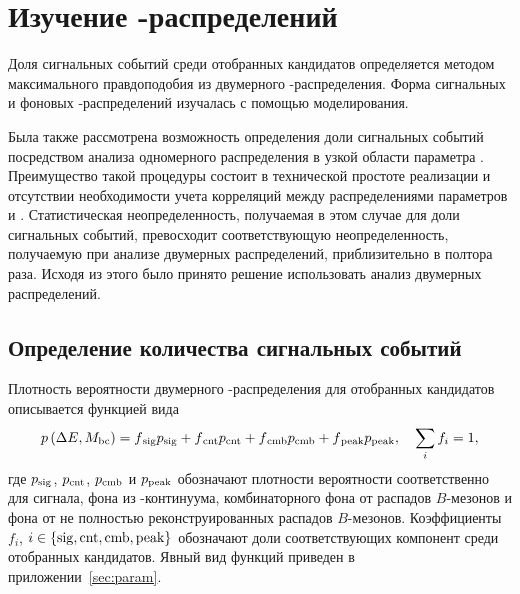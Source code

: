 \section{Изучение \de-\mbc распределений}\label{sec:dembc}
Доля сигнальных событий среди отобранных кандидатов определяется методом максимального правдоподобия из двумерного \de-\mbc распределения.  Форма сигнальных и фоновых \de-\mbc распределений изучалась с помощью моделирования.  

Была также рассмотрена возможность определения доли сигнальных событий посредством анализа одномерного \de распределения в узкой области параметра \mbc.  Преимущество такой процедуры состоит в технической простоте реализации и отсутствии необходимости учета корреляций между распределениями параметров \de и \mbc.  Статистическая неопределенность, получаемая в этом случае для доли сигнальных событий, превосходит соответствующую неопределенность, получаемую при анализе двумерных распределений, приблизительно в полтора раза.  Исходя из этого было принято решение использовать анализ двумерных распределений.
 
\subsection{Определение количества сигнальных событий}
Плотность вероятности двумерного \de-\mbc распределения для отобранных кандидатов описывается функцией вида
 \begin{equation}\label{eq:de-mbc-full-pdf}
 p\left(\Delta E,M_{\mathrm{bc}}\right) = f{}_{\mathrm{sig}} p{}_{\mathrm{sig}}+f{}_{\mathrm{cnt}} p{}_{\mathrm{cnt}}+f{}_{\mathrm{cmb}} p{}_{\mathrm{cmb}}+f{}_{\mathrm{peak}} p{}_{\mathrm{peak}},\quad \sum\limits_i f_i=1,
\end{equation}
где $p{}_{\mathrm{sig}}$, $p{}_{\mathrm{cnt}}$, $p{}_{\mathrm{cmb}}$ и $p{}_{\mathrm{peak}}$ обозначают плотности вероятности соответственно для сигнала, фона из \qqbar-континуума, комбинаторного фона от распадов $B$-мезонов и фона от не полностью реконструированных распадов $B$-мезонов.  Коэффициенты $f_i$, $i\in\{\mathrm{sig}, \mathrm{cnt}, \mathrm{cmb}, \mathrm{peak}\}$ обозначают доли соответствующих компонент среди отобранных кандидатов.  Явный вид функций приведен в приложении~\ref{sec:param}.  

